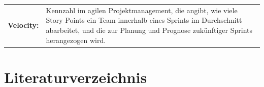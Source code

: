 \documentclass[
    12pt, 
    a4paper,
    ]{scrartcl} %
\begin{document}
\vspace{0.6cm}
\begin{tabular}{p{4cm} p{11.35cm}} 
 \textbf{\normalsize Velocity:} & \normalsize Kennzahl im agilen Projektmanagement, die angibt, wie viele Story Points ein Team innerhalb eines Sprints im Durchschnitt abarbeitet, und die zur Planung und Prognose zukünftiger Sprints herangezogen wird.\\[0.5cm]
\end{tabular}

\newpage
\section*{Literaturverzeichnis} 
{}

\renewcommand{\refname}{} %
\vspace{-\baselineskip} %

\newpage
\end{document}
